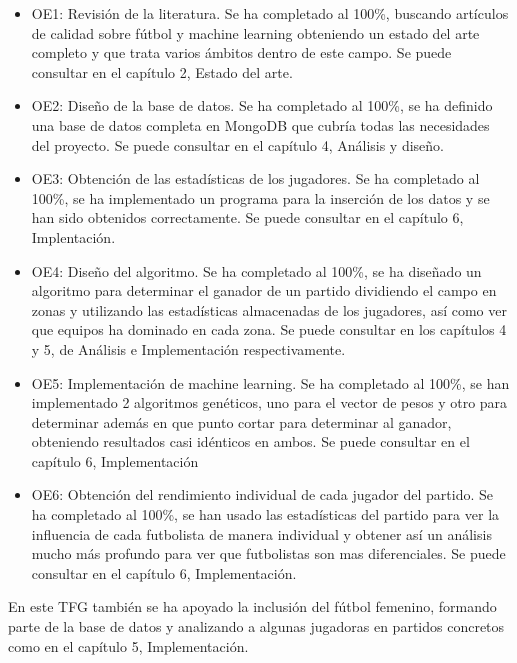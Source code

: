 \begin{itemize}
    \item OE1: Revisión de la literatura. Se ha completado al 100\%, buscando artículos de calidad sobre fútbol y machine learning obteniendo un estado del arte completo y que trata varios ámbitos dentro de este campo. Se puede consultar en el capítulo 2, Estado del arte.

    \item OE2: Diseño de la base de datos. Se ha completado al 100\%, se ha definido una base de datos completa en MongoDB que cubría todas las necesidades del proyecto. Se puede consultar en el capítulo 4, Análisis y diseño.

    \item OE3: Obtención de las estadísticas de los jugadores. Se ha completado al 100\%, se ha implementado un programa para la inserción de los datos y se han sido obtenidos correctamente. Se puede consultar en el capítulo 6, Implentación.

    \item OE4: Diseño del algoritmo. Se ha completado al 100\%, se ha diseñado un algoritmo para determinar el ganador de un partido dividiendo el campo en zonas y utilizando las estadísticas almacenadas de los jugadores, así como ver que equipos ha dominado en cada zona. Se puede consultar en los capítulos 4 y 5, de Análisis e Implementación respectivamente.

    \item OE5: Implementación de machine learning. Se ha completado al 100\%, se han implementado 2 algoritmos genéticos, uno para el vector de pesos y otro para determinar además en que punto cortar para determinar al ganador, obteniendo resultados casi idénticos en ambos. Se puede consultar en el capítulo 6, Implementación

    \item OE6: Obtención del rendimiento individual de cada jugador del partido. Se ha completado al 100\%, se han usado las estadísticas del partido para ver la influencia de cada futbolista de manera individual y obtener así un análisis mucho más profundo para ver que futbolistas son mas diferenciales. Se puede consultar en el capítulo 6, Implementación.
\end{itemize}

En este TFG también se ha apoyado la inclusión del fútbol femenino, formando parte de la base de datos y analizando a algunas jugadoras en partidos concretos como en el capítulo 5, Implementación.

